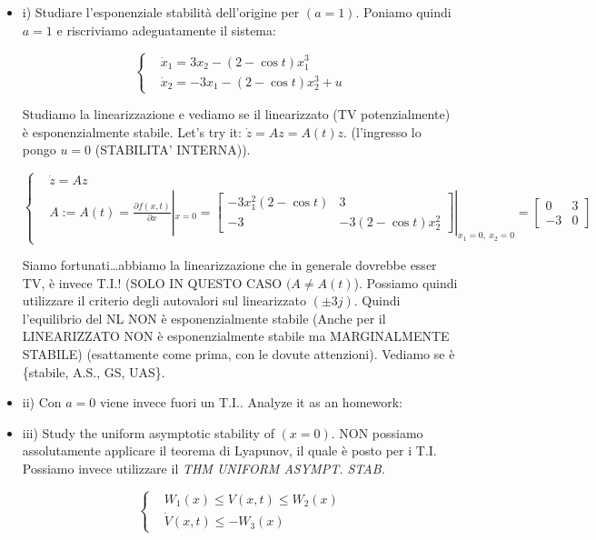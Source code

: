 \begin{itemize}
\item{i)} Studiare l'esponenziale stabilità dell'origine per $(a=1)$. Poniamo quindi $a=1$ e riscriviamo adeguatamente il sistema:

\[
	\left\{
	\begin{aligned}
	&\dot{x}_1 = 3x_2 - (2-\cos{t})x_1^3\\
	&\dot{x}_2 = -3x_1 - (2-\cos{t})x_2^3 + u
	\end{aligned}
	\right.
\]

Studiamo la linearizzazione e vediamo se il linearizzato (TV potenzialmente) è esponenzialmente stabile. Let's try it: $\dot{z}=Az = A(t)z$. (l'ingresso lo pongo $u=0$ (STABILITA' INTERNA)).

\[
	\left\{
	\begin{aligned}
	&\dot{z}=Az\\
	&A := A(t) = \frac{\partial{f(x,t)}}{\partial{x}}|_{x=0} = \begin{bmatrix}-3x_1^2(2-\cos{t})&3\\-3&-3(2-\cos{t})x_2^2\end{bmatrix}|_{x_1=0,\ x_2=0} = \begin{bmatrix}0&3\\-3&0\end{bmatrix}
	\end{aligned}
	\right.
\]

Siamo fortunati\dots abbiamo la linearizzazione che in generale dovrebbe esser TV, è invece T.I.! (SOLO IN QUESTO CASO $(A\neq A(t)$). Possiamo quindi utilizzare il criterio degli autovalori sul linearizzato $(\pm 3j)$. Quindi l'equilibrio del NL NON è esponenzialmente stabile (Anche per il LINEARIZZATO NON è esponenzialmente stabile ma MARGINALMENTE STABILE) (esattamente come prima, con le dovute attenzioni). Vediamo se è \{stabile, A.S., GS, UAS\}.

\item{ii)} Con $a=0$ viene invece fuori un T.I.. Analyze it as an homework:

\item{iii)} Study the uniform asymptotic stability of $(x=0)$. NON possiamo assolutamente applicare il teorema di Lyapunov, il quale è posto per i T.I. Possiamo invece utilizzare il \emph{THM UNIFORM ASYMPT. STAB.}

\[
	\left\{
	\begin{aligned}
	&W_1(x)\leq V(x,t) \leq W_2(x)\\
	&\dot{V}(x,t)\leq -W_3(x)
	\end{aligned}
	\right.
\]


\end{itemize}
